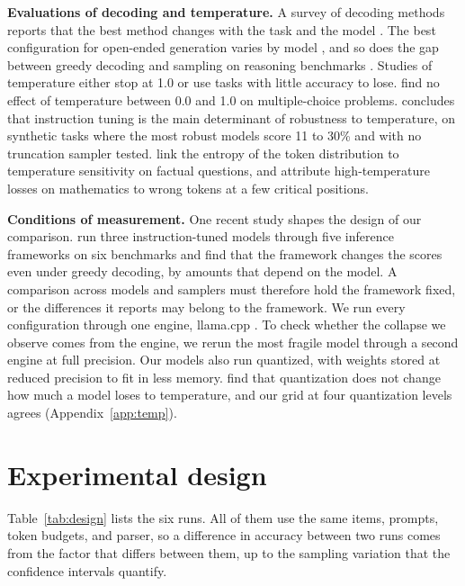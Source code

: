 \documentclass[11pt]{article}
\begin{document}
\textbf{Evaluations of decoding and temperature.} A survey of decoding methods reports that
the best method changes with the task and the model \citep{shi2024decoding}. The best configuration for
open-ended generation varies by model \citep{garcesarias2025decoding}, and so does the gap
between greedy decoding and sampling on reasoning benchmarks \citep{song2024goodbad}. Studies
of temperature either stop at 1.0 or use tasks with little accuracy to lose.
\citet{renze2024temperature} find no effect of temperature between 0.0 and 1.0 on
multiple-choice problems. \citet{grover2026reliability} concludes that instruction tuning is
the main determinant of robustness to temperature, on synthetic tasks where the most robust
models score 11 to 30\% and with no truncation sampler tested. \citet{fastowski2025confidence}
link the entropy of the token distribution to temperature sensitivity on factual questions,
and \citet{troshin2025temperature} attribute high-temperature losses on mathematics to wrong
tokens at a few critical positions.

\textbf{Conditions of measurement.} One recent study shapes the design of our comparison.
\citet{masoudian2026backend} run three instruction-tuned models through five inference
frameworks on six benchmarks and find that the framework changes the scores even under greedy
decoding, by amounts that depend on the model. A comparison across models and samplers must
therefore hold the framework fixed, or the differences it reports may belong to the framework.
We run every configuration through one engine, llama.cpp \citep{gerganov2023llamacpp}. To check whether the collapse we
observe comes from the engine, we rerun the most fragile model through a second engine at full
precision. Our models also run quantized, with weights stored at reduced precision to fit in less memory.
\citet{prasad2026quantization} find that quantization
does not change how much a model loses to temperature, and our grid at four quantization
levels agrees (Appendix~\ref{app:temp}).

\section{Experimental design}
\label{sec:design}

Table~\ref{tab:design} lists the six runs. All of them use the same items, prompts, token
budgets, and parser, so a difference in accuracy between two runs comes from the factor that
differs between them, up to the sampling variation that the confidence intervals quantify.
\end{document}
